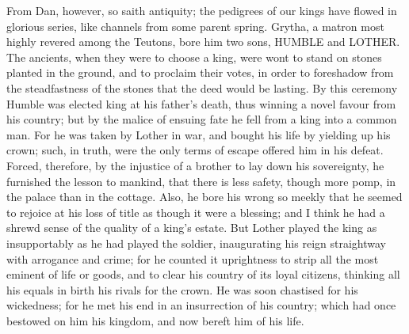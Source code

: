 \documentclass[10pt,a4paper]{report}
\begin{document}
From Dan, however, so saith antiquity; the pedigrees of our kings have flowed in glorious series, like channels from some parent spring. Grytha, a matron most highly revered among the Teutons, bore him two sons, HUMBLE and LOTHER.\\

The ancients, when they were to choose a king, were wont to stand on stones planted in the ground, and to proclaim their votes, in order to foreshadow from the steadfastness of the stones that the deed would be lasting. By this ceremony Humble was elected king at his father's death, thus winning a novel favour from his country; but by the malice of ensuing fate he fell from a king into a common man. For he was taken by Lother in war, and bought his life by yielding up his crown; such, in truth, were the only terms of escape offered him in his defeat. Forced, therefore, by the injustice of a brother to lay down his sovereignty, he furnished the lesson to mankind, that there is less safety, though more pomp, in the palace than in the cottage. Also, he bore his wrong so meekly that he seemed to rejoice at his loss of title as though it were a blessing; and I think he had a shrewd sense of the quality of a king's estate. But Lother played the king as insupportably as he had played the soldier, inaugurating his reign straightway with arrogance and crime; for he counted it uprightness to strip all the most eminent of life or goods, and to clear his country of its loyal citizens, thinking all his equals in birth his rivals for the crown. He was soon chastised for his wickedness; for he met his end in an insurrection of his country; which had once bestowed on him his kingdom, and now bereft him of his life.\\
\end{document}
